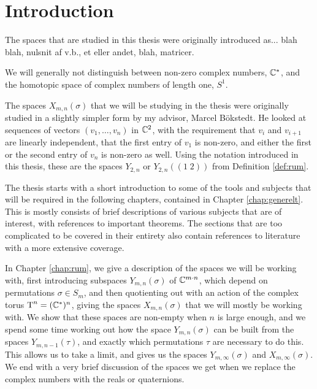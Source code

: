 \chapter{Introduction}

The spaces that are studied in this thesis were originally introduced
as... blah blah, nulsnit af v.b., et eller andet, blah, matricer.



We will generally not distinguish between non-zero complex
numbers, $\mathbb{C}^*$, and the homotopic space of complex numbers of length
one, $S^1$.


The spaces $X_{m,n}(\sigma)$ that we will be studying in the thesis
were originally studied in a slightly simpler form by my advisor,
Marcel B\"okstedt. He looked at sequences of vectors $(v_1,\dots,v_n)$
in $\mathbb{C}^2$, with the requirement that $v_i$ and $v_{i+1}$ are linearly
independent, that the first entry of $v_1$  is non-zero, and either
the first or the second entry of $v_n$ is non-zero as well. Using the
notation introduced in this thesis, these are the spaces $Y_{2,n}$ or
$Y_{2,n}((1\;2))$ from Definition \ref{def:rum}. 

The thesis starts with a short introduction to some of the tools and
subjects that
will be required in the following chapters, contained in Chapter
\ref{chap:generelt}. This is mostly consists of brief descriptions of
various subjects that are of interest, with references to
important theorems. The sections that are too complicated to be
covered in their entirety also contain references to literature with a
more extensive coverage.

In Chapter \ref{chap:rum}, we give a description of the spaces we will
be working with, first introducing subspaces $Y_{m,n}(\sigma)$ of
$\mathbb{C}^{m\cdot n}$, which depend on permutations $\sigma\in S_m$, and
then quotienting out with an action of the complex torus $\operatorname{T}^n =
(\mathbb{C}^*)^n$, giving the spaces $X_{m,n}(\sigma)$ that we will mostly be
working with. We show that these spaces are non-empty when $n$ is
large enough, and we spend some time working out how the space
$Y_{m,n}(\sigma)$ can be built from the spaces $Y_{m,n-1}(\tau)$, and
exactly which permutations $\tau$ are necessary to do this. This
allows us to take a limit, and gives us the spaces
$Y_{m,\infty}(\sigma)$ and $X_{m,\infty}(\sigma)$. We end
with a very brief discussion of the spaces we get when we replace the
complex numbers with the reals or quaternions.


